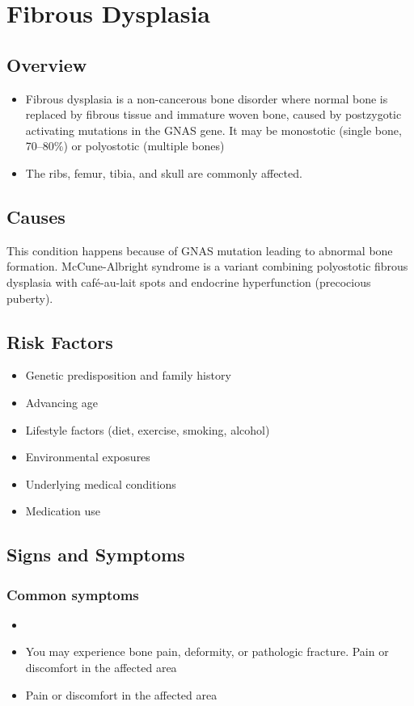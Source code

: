 \chapter{Fibrous Dysplasia}
\label{sec:Fibrous Dysplasia}

\section{Overview}


\begin{itemize}[noitemsep]
  \item Fibrous dysplasia is a non-cancerous bone disorder where normal bone is replaced by fibrous tissue and immature woven bone, caused by postzygotic activating mutations in the GNAS gene. It may be monostotic (single bone, 70--80\%) or polyostotic (multiple bones)
  \item The ribs, femur, tibia, and skull are commonly affected.
\end{itemize}
\section{Causes}
This condition happens because of GNAS mutation leading to abnormal bone formation. McCune-Albright syndrome is a variant combining polyostotic fibrous dysplasia with caf\'{e}-au-lait spots and endocrine hyperfunction (precocious puberty).     
\section{Risk Factors}

\begin{itemize}[noitemsep]
  \item Genetic predisposition and family history
  \item Advancing age
  \item Lifestyle factors (diet, exercise, smoking, alcohol)
  \item Environmental exposures
  \item Underlying medical conditions
  \item Medication use
\end{itemize}
\section{Signs and Symptoms}

\subsection{Common symptoms}
\begin{itemize}[noitemsep]
  \item \item You may experience bone pain, deformity, or pathologic fracture. Pain or discomfort in the affected area    \item Pain or discomfort in the affected area
  \end{itemize}

